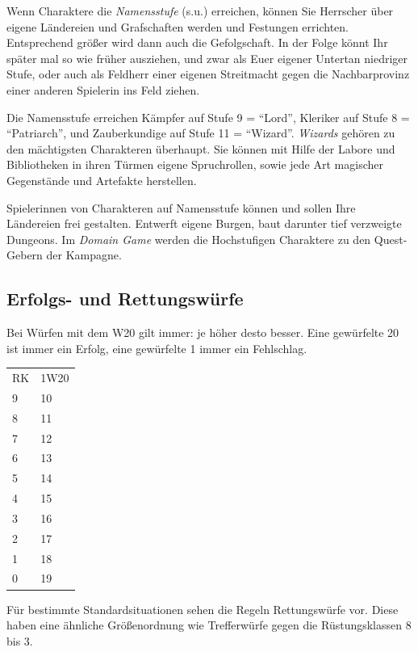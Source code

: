 \documentclass[11pt]{wbzine}
\begin{document}
\begin{multicols}{2}
    Wenn Charaktere die \textit{Namensstufe} (s.u.) erreichen,
    können Sie Herrscher über eigene Ländereien und Grafschaften
    werden und Festungen errichten. Entsprechend größer wird dann
    auch die Gefolgschaft. In der Folge könnt Ihr später mal so wie
    früher ausziehen, und zwar als Euer eigener Untertan niedriger
    Stufe, oder auch als Feldherr einer eigenen Streitmacht gegen
    die Nachbarprovinz einer anderen Spielerin ins Feld ziehen.

    Die Namensstufe erreichen Kämpfer auf Stufe 9 = ``Lord'',
    Kleriker auf Stufe 8 = ``Patriarch'', und Zauberkundige auf
    Stufe 11 = ``Wizard''. \textit{Wizards} gehören zu den
    mächtigsten Charakteren überhaupt. Sie können mit Hilfe der
    Labore und Bibliotheken in ihren Türmen eigene Spruchrollen,
    sowie jede Art magischer Gegenstände und Artefakte herstellen.

    Spielerinnen von Charakteren auf Namensstufe können und
    sollen Ihre Ländereien frei gestalten. Entwerft eigene Burgen,
    baut darunter tief verzweigte Dungeons. Im \textit{Domain Game}
    werden die Hochstufigen Charaktere zu den Quest-Gebern der
    Kampagne.


    \subsection{Erfolgs- und Rettungswürfe}

    Bei Würfen mit dem W20 gilt immer: je höher desto besser. Eine
    gewürfelte 20 ist immer ein Erfolg, eine gewürfelte 1 immer ein
    Fehlschlag.

    \begin{tabularx}{\columnwidth}{YY}
       RK  & 1W20 \\
       9  &    10 \\
       8  &    11 \\
       7  &    12 \\
       6  &    13 \\
       5  &    14 \\
       4  &    15 \\
       3  &    16 \\
       2  &    17 \\
       1  &    18 \\
       0  &    19 \\
    \end{tabularx}
   
    Für bestimmte Standardsituationen sehen die Regeln Rettungswürfe
    vor. Diese haben eine ähnliche Größenordnung wie Trefferwürfe
    gegen die Rüstungsklassen 8 bis 3.


\end{multicols}
\end{document}
